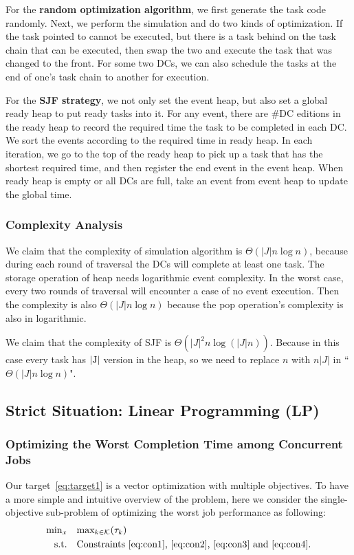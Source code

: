 \documentclass{llncs}
\begin{document}
For the \textbf{random optimization algorithm}, we first generate the task code randomly. Next, we perform the simulation and do two kinds of optimization. If the task pointed to cannot be executed, but there is a task behind on the task chain that can be executed, then swap the two and execute the task that was changed to the front. For some two DCs, we can also schedule the tasks at the end of one's task chain to another for execution.

For the \textbf{SJF strategy}, we not only set the event heap, but also set a global ready heap to put ready tasks into it. For any event, there are \#DC editions in the ready heap to record the required time the task to be completed in each DC. We sort the events according to the required time in ready heap. In each iteration, we go to the top of the ready heap to pick up a task that has the shortest required time, and then register the end event in the event heap. When ready heap is empty or all DCs are full, take an event from event heap to update the global time.

\subsubsection{Complexity Analysis}
We claim that the complexity of simulation algorithm is $\Theta(|J|n\log n)$, because during each round of traversal the DCs will complete at least one task. The storage operation of heap needs logarithmic event complexity. In the worst case, every two rounds of traversal will encounter a case of no event execution. Then the complexity is also $\Theta(|J|n\log n)$ because the pop operation's complexity is also in logarithmic.

We claim that the complexity of SJF is $\Theta(|J|^2 n\log (|J|n))$. Because in this case every task has $\rm |J|$ version in the heap, so we need to replace $n$ with $n|J|$ in ``$\Theta(|{J}|n\log n)$".
          

\subsection{Strict Situation: Linear Programming (LP)}
\subsubsection{Optimizing the Worst Completion Time among Concurrent Jobs}
Our target~\ref{eq:target1} is a vector optimization with multiple objectives. To have a more simple and intuitive overview of the problem, here we consider the single-objective sub-problem of optimizing the worst job performance as following:
\begin{equation*}
    \begin{aligned}
    \mbox{min}_x \quad &\mbox{max}_{k \in \mathcal{K}}(\tau_k) \\
\mbox{s.t.} \quad &\mbox{Constraints~\ref{eq:con1},~\ref{eq:con2},~\ref{eq:con3} and~\ref{eq:con4}.}
    \end{aligned}
\end{equation*}
\end{document}
